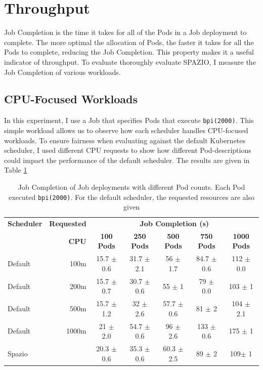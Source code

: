 \section{Throughput}
Job Completion is the time it takes for all of the Pods in a Job deployment to
complete. The more optimal the allocation of Pods, the faster it takes for all
the Pods to complete, reducing the Job Completion. This property makes it a
useful indicator of throughput. To evaluate thoroughly evaluate SPAZIO, I
measure the Job Completion of various workloads.

\subsection{CPU-Focused Workloads}
In this experiment, I use a Job that specifies Pods that execute
\texttt{bpi(2000)}. This simple workload allows us to observe how each scheduler
handles CPU-focused workloads. To ensure fairness when evaluating against the
default Kubernetes scheduler, I used different CPU requests to show how
different Pod-descriptions could impact the performance of the default
scheduler. The results are given in Table \ref{tab:pi-2000-throughput}

\begin{table}[H]
\centering
    \begin{tabular}{|l|r|c|c|c|c|c|}
    \hline
    \textbf{Scheduler} & \textbf{Requested} & \multicolumn{5}{c|}{\textbf{Job Completion (s)}} \\
    \cline{2-7}
    &  \textbf{CPU} & \textbf{100 Pods} & \textbf{250 Pods} & \textbf{500 Pods} & \textbf{750 Pods} & \textbf{1000 Pods} \\
    \hline
    Default & 100m & 15.7 $\pm$ 0.6 & 31.7 $\pm$ 2.1 & 56 $\pm$ 1.7 & 84.7 $\pm$
        0.6 & 112 $\pm$ 0.0 \\
    Default & 200m & 15.7 $\pm$ 0.7 & 30.7 $\pm$ 0.6 & 55 $\pm$ 1 & 79 $\pm$ 0.0
        & 103 $\pm$ 1 \\
    Default & 500m & 15.7 $\pm$ 1.2 & 32 $\pm$ 2.6 & 57.7 $\pm$ 0.6 & 81 $\pm$ 2
        & 104 $\pm$ 2.1 \\
    Default & 1000m & 21 $\pm$ 2.0 & 54.7 $\pm$ 0.6 & 96 $\pm$ 2.6 & 133 $\pm$
        0.6 & 175 $\pm$ 1 \\
    Spazio &  & 20.3 $\pm$ 0.6 & 35.3 $\pm$ 0.6 & 60.3 $\pm$ 2.5 & 89 $\pm$ 2 &
        109$\pm$ 1 \\
    \hline
    \end{tabular}
    \caption{Job Completion of Job deployments with different Pod counts. Each
    Pod executed \texttt{bpi(2000)}. For the default scheduler, the requested
    resources are also given}
    \label{tab:pi-2000-throughput}
\end{table}


